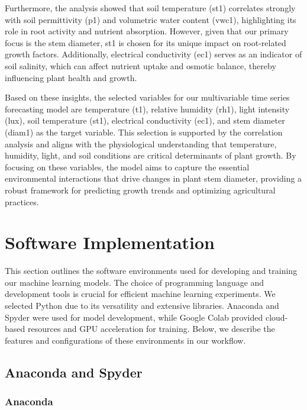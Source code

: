 Furthermore, the analysis showed that soil temperature (st1) correlates strongly with soil permittivity (p1) and volumetric water content (vwc1), highlighting its role in root activity and nutrient absorption. However, given that our primary focus is the stem diameter, st1 is chosen for its unique impact on root-related growth factors. Additionally, electrical conductivity (ec1) serves as an indicator of soil salinity, which can affect nutrient uptake and osmotic balance, thereby influencing plant health and growth.

Based on these insights, the selected variables for our multivariable time series forecasting model are temperature (t1), relative humidity (rh1), light intensity (lux), soil temperature (st1), electrical conductivity (ec1), and stem diameter (diam1) as the target variable. This selection is supported by the correlation analysis and aligns with the physiological understanding that temperature, humidity, light, and soil conditions are critical determinants of plant growth. By focusing on these variables, the model aims to capture the essential environmental interactions that drive changes in plant stem diameter, providing a robust framework for predicting growth trends and optimizing agricultural practices.


\section{Software Implementation}

This section outlines the software environments used for developing and training our machine learning models. The choice of programming language and development tools is crucial for efficient machine learning experiments. We selected Python due to its versatility and extensive libraries. Anaconda and Spyder were used for model development, while Google Colab provided cloud-based resources and GPU acceleration for training. Below, we describe the features and configurations of these environments in our workflow.

\subsection{Anaconda and Spyder}

\subsubsection{Anaconda}

